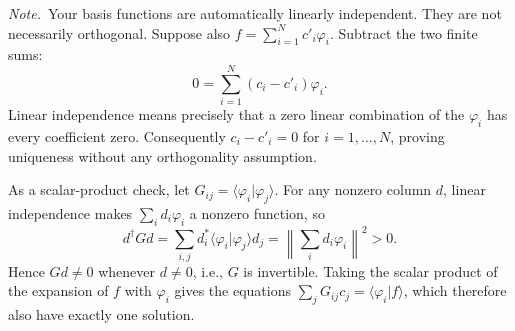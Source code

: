 \emph{Note.}~Your basis functions are automatically linearly independent. They
are not necessarily orthogonal.
\solution
Suppose also $f=\sum_{i=1}^N c'_i\varphi_i$. Subtract the two finite sums:
\[
0=\sum_{i=1}^N(c_i-c'_i)\varphi_i.
\]
Linear independence means precisely that a zero linear combination of the
$\varphi_i$ has every coefficient zero. Consequently $c_i-c'_i=0$ for
$i=1,\ldots,N$, proving uniqueness without any orthogonality assumption.

As a scalar-product check, let $G_{ij}=\langle\varphi_i|\varphi_j\rangle$.
For any nonzero column $d$, linear independence makes $\sum_id_i\varphi_i$
a nonzero function, so
\[
d^\dagger Gd=\sum_{i,j}d_i^*\langle\varphi_i|\varphi_j\rangle d_j
=\left\|\sum_i d_i\varphi_i\right\|^2>0.
\]
Hence $Gd\ne0$ whenever $d\ne0$, i.e., $G$ is invertible. Taking the
scalar product of the expansion of $f$ with $\varphi_i$ gives the equations
$\sum_jG_{ij}c_j=\langle\varphi_i|f\rangle$, which therefore also have
exactly one solution.

